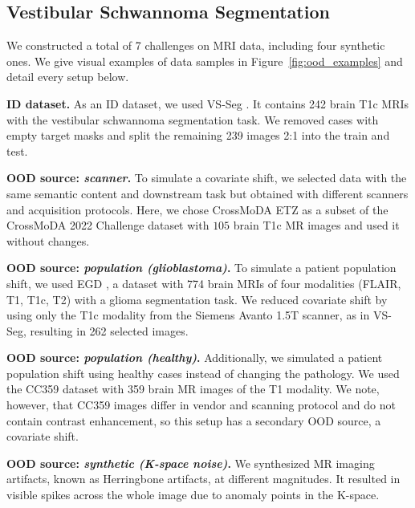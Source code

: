 %

%


\subsection{Vestibular Schwannoma Segmentation}

We constructed a total of 7 challenges on MRI data, including four synthetic ones. We give visual examples of data samples in Figure~\ref{fig:ood_examples} and detail every setup below. %


\textbf{ID dataset.} As an ID  dataset, we used VS-Seg \cite{shapey2021segmentation}. It contains 242 brain T1c MRIs with the vestibular schwannoma segmentation task. We removed cases with empty target masks and split the remaining 239 images 2:1 into the train and test.

\textbf{OOD source: \textit{scanner}.} To simulate a covariate shift, we selected data with the same semantic content and downstream task but obtained with different scanners and acquisition protocols. Here, we chose CrossMoDA ETZ as a subset of the CrossMoDA 2022 Challenge dataset \cite{reuben_dorent_2022_6504722} with $105$ brain T1c MR images and used it without changes.

\textbf{OOD source: \textit{population (glioblastoma)}.} To simulate a patient population shift, we used EGD \cite{van2021erasmus}, a dataset with 774 brain MRIs of four modalities (FLAIR, T1, T1c, T2) with a glioma segmentation task. We reduced covariate shift by using only the T1c modality from the Siemens Avanto 1.5T scanner, as in VS-Seg, resulting in 262 selected images.

\textbf{OOD source: \textit{population (healthy)}.} Additionally, we simulated a patient population shift using healthy cases instead of changing the pathology. We used the CC359 \cite{cc359} dataset with 359 brain MR images of the T1 modality. We note, however, that CC359 images differ in vendor and scanning protocol and do not contain contrast enhancement, so this setup has a secondary OOD source, a covariate shift.

\textbf{OOD source: \textit{synthetic (K-space noise)}.} We synthesized MR imaging artifacts, known as Herringbone artifacts, at different magnitudes. It resulted in visible spikes across the whole image due to anomaly points in the K-space. 

